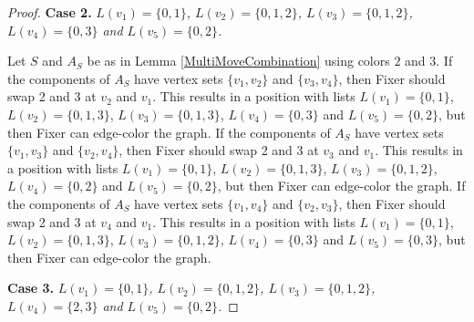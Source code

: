 \documentclass[12pt]{amsart}
\theoremstyle{plain}
\theoremstyle{definition}
\theoremstyle{remark}
\begin{document}
\begin{proof}
\noindent\textbf{Case 2.  }\textit{$L(v_1) = \{0, 1\}$, $L(v_2) = \{0, 1, 2\}$, $L(v_3) = \{0, 1, 2\}$, $L(v_4) = \{0, 3\}$ and $L(v_5) = \{0, 2\}$.}

Let $S$ and $A_S$ be as in Lemma \ref{MultiMoveCombination} using colors $2$ and $3$. If the components of $A_S$ have vertex sets $\{v_1, v_2\}$ and $\{v_3, v_4\}$, then Fixer should swap 2 and 3 at $v_2$ and $v_1$. This results in a position with lists $L(v_1) = \{0, 1\}$, $L(v_2) = \{0, 1, 3\}$, $L(v_3) = \{0, 1, 3\}$, $L(v_4) = \{0, 3\}$ and $L(v_5) = \{0, 2\}$, but then Fixer can edge-color the graph.
If the components of $A_S$ have vertex sets $\{v_1, v_3\}$ and $\{v_2, v_4\}$, then Fixer should swap 2 and 3 at $v_3$ and $v_1$. This results in a position with lists $L(v_1) = \{0, 1\}$, $L(v_2) = \{0, 1, 3\}$, $L(v_3) = \{0, 1, 2\}$, $L(v_4) = \{0, 2\}$ and $L(v_5) = \{0, 2\}$, but then Fixer can edge-color the graph.
If the components of $A_S$ have vertex sets $\{v_1, v_4\}$ and $\{v_2, v_3\}$, then Fixer should swap 2 and 3 at $v_4$ and $v_1$. This results in a position with lists $L(v_1) = \{0, 1\}$, $L(v_2) = \{0, 1, 3\}$, $L(v_3) = \{0, 1, 2\}$, $L(v_4) = \{0, 3\}$ and $L(v_5) = \{0, 3\}$, but then Fixer can edge-color the graph.

\noindent\textbf{Case 3.  }\textit{$L(v_1) = \{0, 1\}$, $L(v_2) = \{0, 1, 2\}$, $L(v_3) = \{0, 1, 2\}$, $L(v_4) = \{2, 3\}$ and $L(v_5) = \{0, 2\}$.}


\end{proof}
\end{document}
